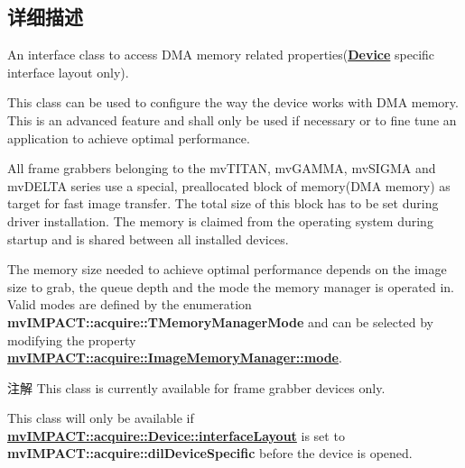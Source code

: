 \subsection{详细描述}
An interface class to access D\+M\+A memory related properties({\bfseries \hyperlink{classmv_i_m_p_a_c_t_1_1acquire_1_1_device}{Device}} specific interface layout only). 

This class can be used to configure the way the device works with D\+M\+A memory. This is an advanced feature and shall only be used if necessary or to fine tune an application to achieve optimal performance.

All frame grabbers belonging to the mv\+T\+I\+T\+A\+N, mv\+G\+A\+M\+M\+A, mv\+S\+I\+G\+M\+A and mv\+D\+E\+L\+T\+A series use a special, preallocated block of memory(\+D\+M\+A memory) as target for fast image transfer. The total size of this block has to be set during driver installation. The memory is claimed from the operating system during startup and is shared between all installed devices.

The memory size needed to achieve optimal performance depends on the image size to grab, the queue depth and the mode the memory manager is operated in. Valid modes are defined by the enumeration {\bfseries mv\+I\+M\+P\+A\+C\+T\+::acquire\+::\+T\+Memory\+Manager\+Mode} and can be selected by modifying the property {\bfseries \hyperlink{classmv_i_m_p_a_c_t_1_1acquire_1_1_image_memory_manager_a614cfb478184bf6cb714e21feb93b624}{mv\+I\+M\+P\+A\+C\+T\+::acquire\+::\+Image\+Memory\+Manager\+::mode}}.

\begin{DoxyNote}{注解}
This class is currently available for frame grabber devices only. 

This class will only be available if {\bfseries \hyperlink{classmv_i_m_p_a_c_t_1_1acquire_1_1_device_ab4dd0ecc9d456bb5ddc01d844c9d6f2d}{mv\+I\+M\+P\+A\+C\+T\+::acquire\+::\+Device\+::interface\+Layout}} is set to {\bfseries mv\+I\+M\+P\+A\+C\+T\+::acquire\+::dil\+Device\+Specific} before the device is opened. 
\end{DoxyNote}


